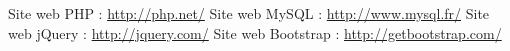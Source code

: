 \documentclass{sigplanconf}
\begin{document}
\appendix








\begin{thebibliography}{}
\softraggedright
{} Site web PHP : \url{http://php.net/}
 Site web MySQL : \url{http://www.mysql.fr/}
 Site web jQuery : \url{http://jquery.com/}
 Site web Bootstrap : \url{http://getbootstrap.com/}

\end{thebibliography}
\end{document}
